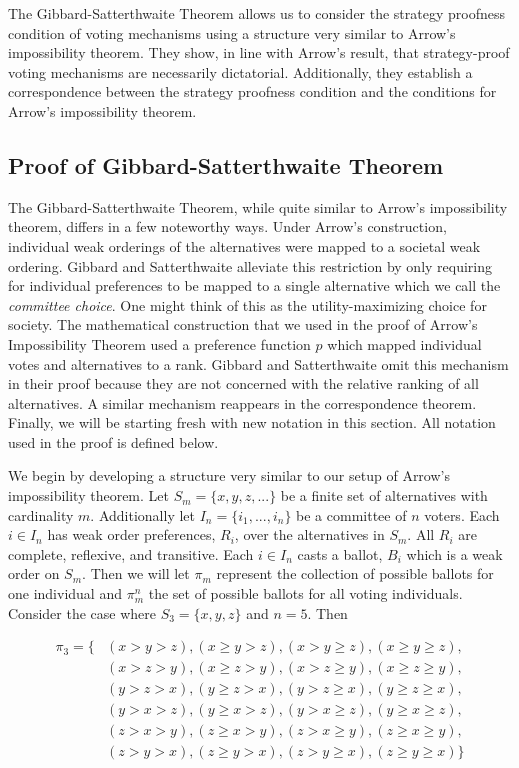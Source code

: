 \documentclass{amsart}
\theoremstyle{plain}
\begin{document}
The Gibbard-Satterthwaite Theorem allows us to consider the strategy proofness condition of voting mechanisms using a structure very similar to Arrow's impossibility theorem. They show, in line with Arrow's result, that strategy-proof voting mechanisms are necessarily dictatorial. Additionally, they establish a correspondence between the strategy proofness condition and the conditions for Arrow's impossibility theorem.

\subsection{Proof of Gibbard-Satterthwaite Theorem \cite{GS}}

The Gibbard-Satterthwaite Theorem, while quite similar to Arrow's impossibility theorem, differs in a few noteworthy ways. Under Arrow's construction, individual weak orderings of the alternatives were mapped to a societal weak ordering. Gibbard and Satterthwaite alleviate this restriction by only requiring for individual preferences to be mapped to a single alternative which we call the \emph{committee choice}. One might think of this as the utility-maximizing choice for society. The mathematical construction that we used in the proof of Arrow's Impossibility Theorem used a preference function $p$ which mapped individual votes and alternatives to a rank. Gibbard and Satterthwaite omit this mechanism in their proof because they are not concerned with the relative ranking of all alternatives. A similar mechanism reappears in the correspondence theorem. Finally, we will be starting fresh with new notation in this section. All notation used in the proof is defined below.

We begin by developing a structure very similar to our setup of Arrow's impossibility theorem. Let $S_m = \{x, y, z, ...\}$ be a finite set of alternatives with cardinality $m$. Additionally let $I_n = \{i_1, ... , i_n\}$ be a committee of $n$ voters. Each $i \in I_n$ has weak order preferences, $R_i$, over the alternatives in $S_m$. All $R_i$ are complete, reflexive, and transitive. Each $i \in I_n$ casts a ballot, $B_i$ which is a weak order on $S_m$. Then we will let $\pi_m$ represent the collection of possible ballots for one individual and $\pi_m^n$ the set of possible ballots for all voting individuals. Consider the case where $S_3 = \{x,y,z\}$ and $n = 5$. Then

\begin{center}

\begin{align*}
    \pi_3 =  \{ & (x > y > z), (x \ge y > z), (x > y \ge z), (x \ge y \ge z), \\ 
    & (x > z > y), (x \ge z > y), (x > z \ge y), (x \ge z \ge y), \\
    &  (y > z > x), (y \ge z > x), (y > z \ge x), (y \ge z \ge x), \\ 
    & (y > x > z), (y \ge x > z), (y > x \ge z), (y \ge x \ge z),\\
    & (z > x > y), (z \ge x > y), (z > x \ge y), (z \ge x \ge y), \\
    & (z > y > x), (z \ge y > x), (z > y \ge x), (z \ge y \ge x)\}
\end{align*}
\end{center}
\end{document}
